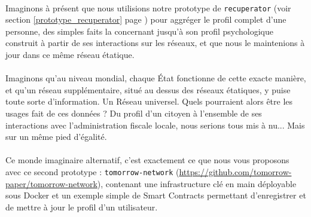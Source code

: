 \paragraph{} Imaginons à présent que nous utilisions notre prototype de \lstinline{recuperator} (voir section \ref{prototype_recuperator}
page \pageref{prototype_recuperator}) pour aggréger le profil complet d'une personne, des simples faits la concernant jusqu'à
son profil psychologique construit à partir de ses interactions sur les réseaux, et que nous le maintenions à jour dans 
ce même réseau étatique.

\paragraph{} Imaginons qu'au niveau mondial, chaque État fonctionne de cette exacte manière, et qu'un réseau supplémentaire,
situé au dessus des réseaux étatiques, y puise toute sorte d'information. Un Réseau universel. Quels pourraient alors être
les usages fait de ces données ? Du profil d'un citoyen à l'ensemble de ses interactions avec l'administration fiscale 
locale, nous serions tous mis à nu... Mais sur un même pied d'égalité.

\paragraph{} Ce monde imaginaire alternatif, c'est exactement ce que nous vous proposons avec ce second prototype : 
\lstinline{tomorrow-network} (\url{https://github.com/tomorrow-paper/tomorrow-network}), contenant une infrastructure clé
en main déployable sous Docker et un exemple simple de Smart Contracts permettant d'enregistrer et de mettre à jour le 
profil d'un utilisateur.